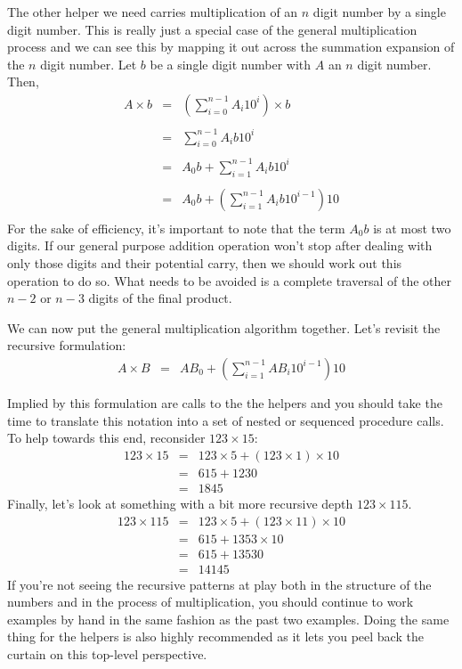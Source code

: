\documentclass[10pt]{article}
\begin{document}
The other helper we need carries multiplication of an $n$ digit number by a single digit number.  This is really just a special case of the general multiplication process and we can see this by mapping it out across the summation expansion of the $n$ digit number. Let $b$ be a single digit number with $A$ an $n$ digit number. Then,
\[
\begin{array}{rcl}
A \times b &=& \left( \sum\limits_{i=0}^{n-1}A_i10^i \right) \times b \\ \\
 &=& \sum\limits_{i=0}^{n-1}A_{i}b10^i  \\ \\
 &=& A_0b + \sum\limits_{i=1}^{n-1}A_{i}b10^i \\  \\
 &=& A_0b + \left(\sum\limits_{i=1}^{n-1}A_{i}b10^{i-1}\right)10 \\
\end{array}
\]
For the sake of efficiency, it's important to note that the term $A_0b$ is at most two digits. If our general purpose addition operation won't stop after dealing with only those digits and their potential carry, then we should work out this operation to do so. What needs to be avoided is a complete traversal of the other $n-2$ or $n-3$ digits of the final product.

We can now put the general multiplication algorithm together. Let's revisit the recursive formulation:
\[
\begin{array}{rcl}
A \times B &=& AB_0 + \left(\sum\limits_{i=1}^{n-1}AB_i10^{i-1}\right)10 \\ \\
\end{array}
\]
Implied by this formulation are calls to the the helpers and you should take the time to translate this notation into a set of nested or sequenced procedure calls. To help towards this end, reconsider $123 \times 15$:
\[
\begin{array}{rcl}
123 \times 15 &=& 123\times 5 + (123\times 1)\times 10 \\
 &=& 615 + 1230 \\
 &=& 1845
\end{array}
\]
Finally, let's look at something with a bit more recursive depth $123 \times 115$.
\[
\begin{array}{rcl}
123 \times 115 &=& 123\times 5 + (123\times 11)\times 10 \\
 &=& 615 + 1353 \times 10 \\
 &=& 615 + 13530 \\
 &=& 14145
\end{array}
\]
If you're not seeing the recursive patterns at play both in the structure of the numbers and in the process of multiplication, you should continue to work examples by hand in the same fashion as the past two examples. Doing the same thing for the helpers is also highly recommended as it lets you peel back the curtain on this top-level perspective.
\end{document}
